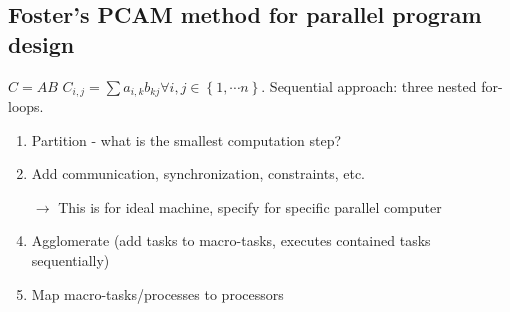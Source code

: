 \documentclass[a4paper]{article}
\begin{document}
\subsection{Foster's PCAM method for parallel program design}
$C=AB$ $C_{i,j}=\sum a_{i,k}b_{kj} \forall i,j\in\left\{ 1,\cdots n \right\}$.
Sequential approach: three nested for-loops.\\
\begin{enumerate}
    \item Partition - what is the smallest computation step?
    \item Add communication, synchronization, constraints, etc.
    \item[$\rightarrow$] This is for ideal machine, specify for specific parallel computer
    \item Agglomerate (add tasks to macro-tasks, executes contained tasks
        sequentially)
    \item Map macro-tasks/processes to processors
\end{enumerate}
\end{document}
